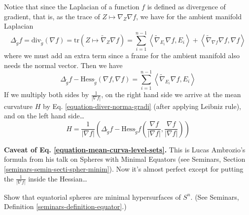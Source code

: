 \documentclass{book}
\begin{document}
Notice that since the Laplacian of a function
$f$ is defined as divergence of
gradient, that is, as the trace of $Z\mapsto
\nabla_Z\nabla f$,
we have for the ambient manifold Laplacian
\begin{equation}
\label{equation-immersion-Laplacian}
\Delta_{\tilde{g}}
f=\text{div}_{\tilde{g}}(\nabla f)
=\text{tr}(Z \mapsto \tilde{\nabla}_Z\nabla
f)
=\sum_{i=1}^{n-1}\left\langle{}\tilde{\nabla}_{E_i}
\nabla
f,E_i\right\rangle{}
+\left\langle{}\tilde{\nabla}_{\nabla f}\nabla
f,\nabla f\right\rangle{}
\end{equation}
where we must add an extra term since a frame
for the ambient manifold
also needs the normal vector. Then we have
$$
\Delta_{\tilde{g}}f-\text{Hess}_{\tilde{g}}
(\nabla
f,\nabla f)
=\sum_{i=1}^{n-1}\left\langle{}\tilde{\nabla}_{E_i}
\nabla
f,E_i\right\rangle{}
$$
If we multiply both sides by
$\frac{1}{|\nabla f|}$, on the right hand
side we
arrive at the mean curvature $H$ by Eq.
\ref{equation-diver-norma-gradi} (after
applying Leibniz rule),
 and on the left hand side…
\begin{equation}
\label{equation-mean-curva-level-sets}
H=\frac{1}{|\nabla
f|}\left(\Delta_{\tilde{g}}
f-\text{Hess}_{\tilde{g}}f
\left(\frac{\nabla f}{|\nabla
f|},\frac{\nabla f}{|\nabla f|}\right)\right)
\end{equation}

{\bf Caveat of Eq.
\ref{equation-mean-curva-level-sets}.} This
is
Lucas Ambrozio's formula from his talk on
Spheres with Minimal Equators (see
Seminars, Section
\ref{seminars-semin-secti-spher-minim}).
Now it's almost perfect except for
putting the $\frac{1}{|\nabla f|}$ inside the
Hessian…

\begin{example}
\label{example-equatorial-spheres}
Show that equatorial spheres are minimal
hypersurfaces of $S^n$. (See
Seminars, Definition
\ref{seminars-definition-equator}.)
\end{example}
\end{document}

